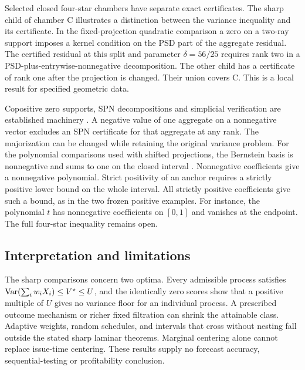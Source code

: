 Selected closed four-star chambers have separate exact certificates.
The sharp child of chamber C illustrates a distinction between the
variance inequality and its certificate. In the fixed-projection
quadratic comparison a zero on a two-ray support imposes a kernel
condition on the PSD part of the aggregate residual. The certified
residual at this split and parameter $\delta=56/25$ requires rank two
in a PSD-plus-entrywise-nonnegative decomposition. The other child has
a certificate of rank one after the projection is changed. Their union
covers C. This is a local result for specified geometric data.

Copositive zero supports, SPN decompositions and simplicial verification
are established machinery \cite{hildebrand,shaked,bundfuss,bundfussadaptive}. A negative
value of one aggregate on a nonnegative vector excludes an SPN
certificate for that aggregate at any rank. The majorization can be
changed while retaining the original variance problem. For the
polynomial comparisons used with shifted projections, the Bernstein
basis is nonnegative and sums to one on the closed interval
\cite{funfzig}. Nonnegative coefficients give a nonnegative polynomial.
Strict positivity of an anchor requires a strictly positive lower
bound on the whole interval. All strictly positive coefficients give
such a bound, as in the two frozen positive examples. For instance,
the polynomial $t$ has nonnegative coefficients on $[0,1]$ and
vanishes at the endpoint. The full four-star inequality remains open.

\subsection{Interpretation and limitations}

The sharp comparisons concern two optima. Every admissible process
satisfies $\operatorname{Var}(\sum_i w_iX_i)\le V^\star\le U$, and the identically
zero scores show that a positive multiple of $U$ gives no variance
floor for an individual process. A prescribed outcome mechanism or
richer fixed filtration can shrink the attainable class. Adaptive
weights, random schedules, and intervals that cross without nesting
fall outside the stated sharp laminar theorems. Marginal centering
alone cannot replace issue-time centering. These results supply no
forecast accuracy, sequential-testing or profitability conclusion.
